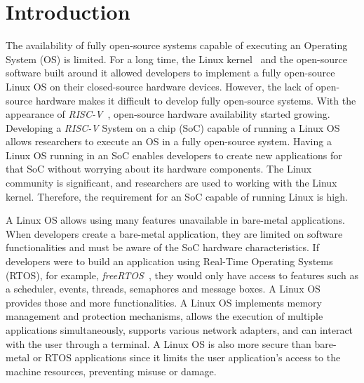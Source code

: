 
\section{Introduction}
\label{sec:intro}

The availability of fully open-source systems capable of executing an Operating System (OS) is limited. For a long time, the Linux kernel~\cite{torvalds1997linux} and the open-source software built around it allowed developers to implement a fully open-source Linux OS on their closed-source hardware devices. However, the lack of open-source hardware makes it difficult to develop fully open-source systems. With the appearance of \textit{RISC-V}~\cite{asanovic2014instruction}, open-source hardware availability started growing. Developing a \textit{RISC-V} System on a chip (SoC) capable of running a Linux OS allows researchers to execute an OS in a fully open-source system. Having a Linux OS running in an SoC enables developers to create new applications for that SoC without worrying about its hardware components. The Linux community is significant, and researchers are used to working with the Linux kernel. Therefore, the requirement for an SoC capable of running Linux is high. 

A Linux OS allows using many features unavailable in bare-metal applications. When developers create a bare-metal application, they are limited on software functionalities and must be aware of the SoC hardware characteristics. If developers were to build an application using Real-Time Operating Systems (RTOS), for example, \textit{freeRTOS}~\cite{barry2008freertos}, they would only have access to features such as a scheduler, events, threads, semaphores and message boxes. A Linux OS provides those and more functionalities. A Linux OS implements memory management and protection mechanisms, allows the execution of multiple applications simultaneously, supports various network adapters, and can interact with the user through a terminal. A Linux OS is also more secure than bare-metal or RTOS applications since it limits the user application's access to the machine resources, preventing misuse or damage.

